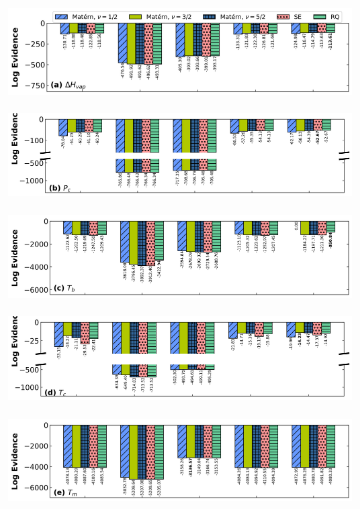 \documentclass[journal=jacsat,manuscript=article]{achemso}
\begin{document}
\begin{figure}
     \centering
     \begin{subfigure}[b]{0.75\textwidth}
         \centering
         \includegraphics[width=\textwidth]{images/lml_bar_chart_Hvap.png}
     \end{subfigure}
     \hfill
     \begin{subfigure}[b]{0.75\textwidth}
         \centering
         \includegraphics[width=\textwidth]{images/lml_bar_chart_Pc.png}
     \end{subfigure}
     \hfill
     \begin{subfigure}[b]{0.75\textwidth}
         \centering
         \includegraphics[width=\textwidth]{images/lml_bar_chart_Tb.png}
     \end{subfigure}
     \hfill
     \begin{subfigure}[b]{0.75\textwidth}
         \centering
         \includegraphics[width=\textwidth]{images/lml_bar_chart_Tc.png}
     \end{subfigure}
     \hfill
     \begin{subfigure}[b]{0.75\textwidth}
         \centering
         \includegraphics[width=\textwidth]{images/lml_bar_chart_Tm.png}

\end{subfigure}
\end{figure}
\end{document}
